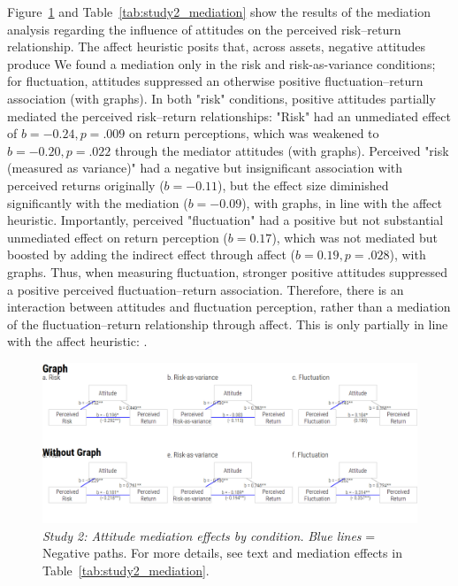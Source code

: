 \documentclass[a4paper,man, natbib,floatsintext]{apa6} %
\begin{document}
{Figure~\ref{fig:study2_mediation_paths} and Table~\ref{tab:study2_mediation} show the results of the mediation analysis regarding the influence of attitudes on the perceived risk--return relationship. The affect heuristic \citep{Finucane2000} posits that, across assets, negative attitudes produce  We found a mediation only in the risk and risk-as-variance conditions; for fluctuation, attitudes suppressed an otherwise positive fluctuation--return association (with graphs). In both "risk" conditions, positive attitudes partially mediated the perceived risk--return relationships: "Risk" had an unmediated effect of $b=-0.24, p=.009$ on return perceptions, which was weakened to $b=-0.20, p=.022$ through the mediator attitudes (with graphs). Perceived "risk (measured as variance)" had a negative but insignificant association with perceived returns originally ($b=-0.11$), but the effect size diminished significantly with the mediation ($b=−0.09$), with graphs, in line with the affect heuristic. Importantly, perceived "fluctuation" had a positive but not substantial unmediated effect on return perception ($b=0.17$), which was not mediated but boosted by adding the indirect effect through affect ($b=0.19, p=.028$), with graphs. Thus, when measuring fluctuation, stronger positive attitudes suppressed a positive perceived fluctuation--return association. Therefore, there is an interaction between attitudes and fluctuation perception, rather than a mediation of the fluctuation--return relationship through affect. This is only partially in line with the affect heuristic: .

\begin{figure}[H]
    \centering
    \includegraphics{fig7}
    \caption{\textit{Study 2: Attitude mediation effects by condition.} \textit{Blue lines} = Negative paths. For more details, see text and mediation effects in Table~\ref{tab:study2_mediation}.}
    \label{fig:study2_mediation_paths}
\end{figure}


}
\end{document}
